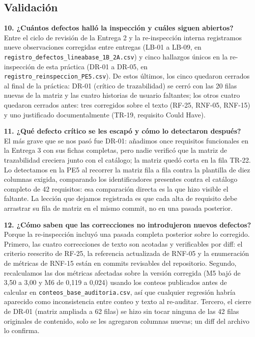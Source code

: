 \subsection*{Validación}

\noindent\textbf{10. ¿Cuántos defectos halló la inspección y cuáles siguen abiertos?}\\
Entre el ciclo de revisión de la Entrega 2 y la re-inspección interna registramos nueve observaciones corregidas entre entregas (LB-01 a LB-09, en \texttt{registro\_defectos\_lineabase\_1B\_2A.csv}) y cinco hallazgos únicos en la re-inspección de esta práctica (DR-01 a DR-05, en \texttt{registro\_reinspeccion\_PE5.csv}). De estos últimos, los cinco quedaron cerrados al final de la práctica: DR-01 (crítico de trazabilidad) se cerró con las 20 filas nuevas de la matriz y las cuatro historias de usuario faltantes; los otros cuatro quedaron cerrados antes: tres corregidos sobre el texto (RF-25, RNF-05, RNF-15) y uno justificado documentalmente (TR-19, requisito Could Have).

\medskip
\noindent\textbf{11. ¿Qué defecto crítico se les escapó y cómo lo detectaron después?}\\
El más grave que se nos pasó fue DR-01: añadimos once requisitos funcionales en la Entrega 3 con sus fichas completas, pero nadie verificó que la matriz de trazabilidad creciera junto con el catálogo; la matriz quedó corta en la fila TR-22. Lo detectamos en la PE5 al recorrer la matriz fila a fila contra la plantilla de diez columnas exigida, comparando los identificadores presentes contra el catálogo completo de 42 requisitos: esa comparación directa es la que hizo visible el faltante. La lección que dejamos registrada es que cada alta de requisito debe arrastrar su fila de matriz en el mismo commit, no en una pasada posterior.

\medskip
\noindent\textbf{12. ¿Cómo saben que las correcciones no introdujeron nuevos defectos?}\\
Porque la re-inspección incluyó una pasada completa posterior sobre lo corregido. Primero, las cuatro correcciones de texto son acotadas y verificables por diff: el criterio reescrito de RF-25, la referencia actualizada de RNF-05 y la enumeración de métricas de RNF-15 están en commits revisables del repositorio. Segundo, recalculamos las dos métricas afectadas sobre la versión corregida (M5 bajó de 3,50 a 3,00 y M6 de 0,119 a 0,024) usando los conteos publicados antes de calcular en \texttt{conteos\_base\_auditoria.csv}, así que cualquier regresión habría aparecido como inconsistencia entre conteo y texto al re-auditar. Tercero, el cierre de DR-01 (matriz ampliada a 62 filas) se hizo sin tocar ninguna de las 42 filas originales de contenido, solo se les agregaron columnas nuevas; un diff del archivo lo confirma.

